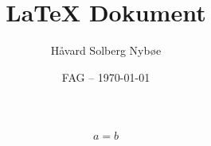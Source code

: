 \documentclass[a4paper, 12pt]{article}  %
\title{{\LaTeX} Dokument}               %
\author{Håvard Solberg Nybøe}           %
\date{FAG -- \today}                    %
\begin{document}
\maketitle

\section{}

\begin{align}
    a=b
\end{align}

\end{document}
